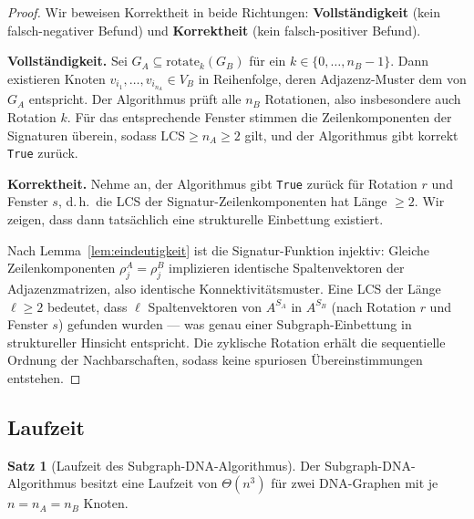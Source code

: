 ﻿\documentclass[a4paper,12pt]{article}
\theoremstyle{definition}
\newtheorem{satz}{Satz}
\begin{document}
\begin{proof}
    Wir beweisen Korrektheit in beide Richtungen: \textbf{Vollständigkeit}
    (kein falsch-negativer Befund) und \textbf{Korrektheit} (kein falsch-positiver
    Befund).

    \textbf{Vollständigkeit.}
    Sei $G_A \subseteq \mathrm{rotate}_k(G_B)$ für ein $k \in \{0, \ldots, n_B-1\}$.
    Dann existieren Knoten $v_{i_1}, \ldots, v_{i_{n_A}} \in V_B$ in Reihenfolge,
    deren Adjazenz-Muster dem von $G_A$ entspricht. Der Algorithmus prüft alle
    $n_B$ Rotationen, also insbesondere auch Rotation $k$. Für das entsprechende
    Fenster stimmen die Zeilenkomponenten der Signaturen überein, sodass
    $\mathrm{LCS} \geq n_A \geq 2$ gilt, und der Algorithmus gibt korrekt
    \texttt{True} zurück.

    \textbf{Korrektheit.}
    Nehme an, der Algorithmus gibt \texttt{True} zurück für Rotation $r$ und
    Fenster $s$, d.\,h.\ die LCS der Signatur-Zeilenkomponenten hat Länge
    $\geq 2$. Wir zeigen, dass dann tatsächlich eine strukturelle Einbettung
    existiert.

    Nach Lemma~\ref{lem:eindeutigkeit} ist die Signatur-Funktion injektiv:
    Gleiche Zeilenkomponenten $\rho_j^A = \rho_j^B$ implizieren identische
    Spaltenvektoren der Adjazenzmatrizen, also identische Konnektivitätsmuster.
    Eine LCS der Länge $\ell \geq 2$ bedeutet, dass $\ell$ Spaltenvektoren
    von $A^{S_A}$ in $A^{S_B}$ (nach Rotation $r$ und Fenster $s$) gefunden
    wurden --- was genau einer Subgraph-Einbettung in struktureller Hinsicht
    entspricht. Die zyklische Rotation erhält die sequentielle Ordnung der
    Nachbarschaften, sodass keine spuriosen Übereinstimmungen entstehen. 
\end{proof}

\subsection{Laufzeit}

\begin{satz}[Laufzeit des Subgraph-DNA-Algorithmus]
    \label{satz:laufzeit}
    Der Subgraph-DNA-Algorithmus besitzt eine Laufzeit von $\Theta(n^3)$ für zwei
    DNA-Graphen mit je $n = n_A = n_B$ Knoten.
\end{satz}
\end{document}
